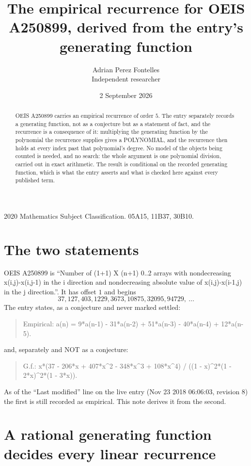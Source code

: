 \documentclass[11pt,a4paper]{article}
\title{The empirical recurrence for OEIS A250899, derived from the entry's generating function}
\author{Adrian Perez Fontelles\\ \small Independent researcher}
\date{2 September 2026}
\theoremstyle{plain}
\theoremstyle{definition}
\begin{document}
\maketitle

\begin{abstract}
OEIS A250899 carries an empirical recurrence of order $5$. The entry separately records a
generating function, not as a conjecture but as a statement of fact, and the recurrence is a
consequence of it: multiplying the generating function by the polynomial the recurrence
supplies gives a POLYNOMIAL, and the recurrence then holds at every index past that
polynomial's degree. No model of the objects being counted is needed, and no search: the
whole argument is one polynomial division, carried out in exact arithmetic. The result is
conditional on the recorded generating function, which is what the entry asserts and what is
checked here against every published term.
\end{abstract}

\noindent\small 2020 Mathematics Subject Classification. 05A15, 11B37, 30B10.\normalsize

\section{The two statements}

OEIS A250899 is ``Number of (1+1) X (n+1) 0..2 arrays with nondecreasing x(i,j)-x(i,j-1) in the i direction and nondecreasing absolute value of x(i,j)-x(i-1,j) in the j direction.''. It has offset $1$ and begins
\[
37, 127, 403, 1229, 3673, 10875, 32095, 94729,\ \dots
\]
The entry states, as a conjecture and never marked settled:
\begin{quote}
Empirical: a(n) = 9*a(n-1) - 31*a(n-2) + 51*a(n-3) - 40*a(n-4) + 12*a(n-5).
\end{quote}
and, separately and NOT as a conjecture:
\begin{quote}
G.f.: x*(37 - 206*x + 407*x\^{}2 - 348*x\^{}3 + 108*x\^{}4) / ((1 - x)\^{}2*(1 - 2*x)\^{}2*(1 - 3*x)).
\end{quote}
As of the ``Last modified'' line on the live entry (Nov 23 2018 06:06:03, revision 8) the first is still
recorded as empirical. This note derives it from the second.

\section{A rational generating function decides every linear recurrence}
\end{document}
